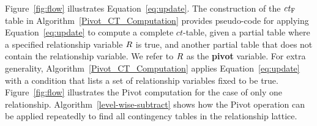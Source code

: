 \documentclass{acm_proc_article-sp}
\newcommand{\ct}{\mathit{ct}}
\begin{document}

Figure~\ref{fig:flow} illustrates Equation~\eqref{eq:update}. 
The construction of the $\ct_{\false}$ table in 
Algorithm~\ref{Pivot_CT_Computation} provides pseudo-code for applying Equation~\eqref{eq:update} to compute a complete $\ct$-table, given a partial table where a specified relationship variable $R$  is true,
and another partial table that does not contain the relationship variable. 
We refer to $R$ as the \textbf{pivot} variable. 
For extra generality, Algorithm~\ref{Pivot_CT_Computation} applies Equation~\eqref{eq:update} with a condition that lists a set of relationship variables fixed to be true.  Figure~\ref{fig:flow} illustrates the  Pivot computation for the case of only one relationship. 
Algorithm~\ref{level-wise-subtract} shows how the Pivot operation can be applied repeatedly to find all contingency tables in the relationship lattice. 
\end{document}
